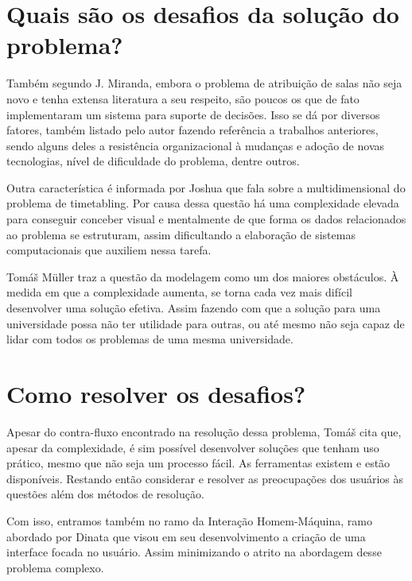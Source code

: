 
\section{Quais são os desafios da solução do problema?}

Também segundo J. Miranda, embora o problema de atribuição de salas não seja novo e tenha extensa literatura a seu respeito, são poucos os que de fato implementaram um sistema para suporte de decisões. Isso se dá por diversos fatores, também listado pelo autor fazendo referência a trabalhos anteriores, sendo alguns deles a resistência organizacional à mudanças e adoção de novas tecnologias, nível de dificuldade do problema, dentre outros.


Outra característica é informada por Joshua \cite{THOMAS2009} que fala sobre a multidimensional do problema de timetabling. Por causa dessa questão há uma complexidade elevada para conseguir conceber visual e mentalmente de que forma os dados relacionados ao problema se estruturam, assim dificultando a elaboração de sistemas computacionais que auxiliem nessa tarefa.

Tomáš Müller \cite{MURRAY2007} traz a questão da modelagem como um dos maiores obstáculos. À medida em que a complexidade aumenta, se torna cada vez mais difícil desenvolver uma solução efetiva. Assim fazendo com que a solução para uma universidade possa não ter utilidade para outras, ou até mesmo não seja capaz de lidar com todos os problemas de uma mesma universidade.

\section{Como resolver os desafios?}

Apesar do contra-fluxo encontrado na resolução dessa problema, Tomáš cita que, apesar da complexidade, é sim possível desenvolver soluções que tenham uso prático, mesmo que não seja um processo fácil. As ferramentas existem e estão disponíveis. Restando então considerar e resolver as preocupações dos usuários às questões além dos métodos de resolução.

Com isso, entramos também no ramo da Interação Homem-Máquina, ramo abordado por Dinata \cite{ANDRE2018} que visou em seu desenvolvimento a criação de uma interface focada no usuário. Assim minimizando o atrito na abordagem desse problema complexo.
